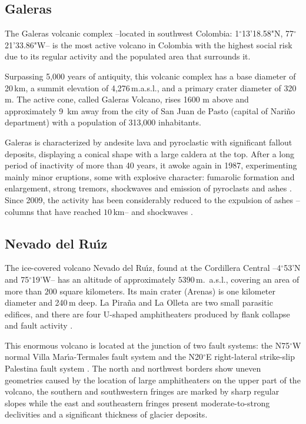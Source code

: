 \documentclass[letterpaper,10pt,titlepage,linenumber]{article}
\begin{document}
\subsection{Galeras}
\label{subsec:Galeras}
The Galeras volcanic complex --located in southwest Colombia: 1$^{\circ}$13'18.58"N, 77$^{\circ}$21'33.86"W-- is the most active volcano in Colombia with the highest social risk due to its regular activity and the populated area that surrounds it. 

Surpassing 5,000 years of antiquity, this volcanic complex has a base diameter of 20\,km, a summit elevation of 4,276\,m.a.s.l., and a primary crater diameter of 320\,m. The active cone, called Galeras Volcano, rises 1600 m above and approximately 9\, km away from the city of San Juan de Pasto (capital of Nari\~no department) with a population of 313,000 inhabitants.

Galeras is characterized by andesite lava and pyroclastic with significant fallout deposits, displaying a conical shape with a large caldera at the top. After a long period of inactivity of more than 40 years, it awoke again in 1987, experimenting mainly minor eruptions, some with explosive character: fumarolic formation and enlargement, strong tremors, shockwaves and emission of pyroclasts and ashes \cite{CalvacheCortesWilliams1997, CruzChouet1997}. Since 2009, the activity has been considerably reduced to the expulsion of ashes --columns that have reached $10$\,km-- and shockwaves \cite{CortesRaigosa1997}.


\subsection{Nevado del Ru\'{\i}z}
\label{subsec:NevadoRuiz}
The ice-covered volcano Nevado del Ru\'{\i}z, found at the Cordillera Central --4$^{\circ}$53'N and 75$^{\circ}$19'W-- has an altitude of approximately $5390$\,m.\, a.s.l., covering an area of more than $200$ square kilometers. Its main crater (Arenas) is one kilometer diameter and 240\,m deep. La Pira\~na and La Olleta are two small parasitic edifices, and there are four U-shaped amphitheaters produced by flank collapse and fault activity \cite{Sennert2016}.

This enormous volcano is located at the junction of two fault systems: the N75$^{\circ}$W normal Villa Mar\'{\i}a-Termales fault system and the N20$^{\circ}$E right-lateral strike-slip Palestina fault system \cite{BorreroEtal2009}. The north and northwest borders show uneven geometries caused by the location of large amphitheaters on the upper part of the volcano, the southern and southwestern fringes are marked by sharp regular slopes while the east and southeastern fringes present moderate-to-strong declivities and a significant thickness of glacier deposits.
\end{document}
